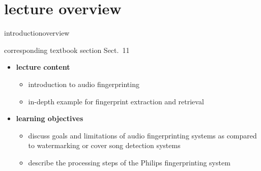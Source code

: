 


\subtitle{Module 11.0: Audio Fingerprinting}


	

    \section[overview]{lecture overview}
        \begin{frame}{introduction}{overview}
            \begin{block}{corresponding textbook section}
                    Sect.~11
            \end{block}

            \begin{itemize}
                \item   \textbf{lecture content}
                    \begin{itemize}
                        \item   introduction to audio fingerprinting
                        \item   in-depth example for fingerprint extraction and retrieval
                    \end{itemize}
                \bigskip
                \item<2->   \textbf{learning objectives}
                    \begin{itemize}
                        \item   discuss goals and limitations of audio fingerprinting systems as compared to watermarking or cover song detection systems
                        \item   describe the processing steps of the Philips fingerprinting system
                    \end{itemize}
            \end{itemize}
        \end{frame}

